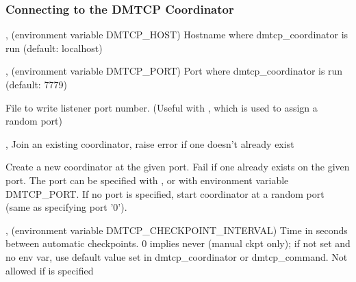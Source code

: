\subsubsection{Connecting to the DMTCP Coordinator}
\begin{Description}
  \item[\Opt{-h}, \Opt{--host} \Arg{hostname} (environment variable DMTCP_HOST)]
    Hostname where dmtcp_coordinator is run (default: localhost)

  \item[\Opt{-p}, \Opt{--port} \Arg{port} (environment variable DMTCP_PORT)]
    Port where dmtcp_coordinator is run (default: 7779)

  \item[\OptSArg{--port-file}{filename}]
    File to write listener port number.
    (Useful with , which is used to assign a random port)

  \item[\Opt{-j}, \Opt{--join}]
    Join an existing coordinator, raise error if one doesn't
    already exist

  \item[\Opt{--new-coordinator}]
    Create a new coordinator at the given port. Fail if one
    already exists on the given port. The port can be specified
    with , or with environment variable DMTCP_PORT.  If no
    port is specified, start coordinator at a random port (same
    as specifying port '0').


  \item[\Opt{-i}, \Opt{-interval} \Arg{seconds} (environment variable DMTCP_CHECKPOINT_INTERVAL)]
    Time in seconds between automatic checkpoints.
    0 implies never (manual ckpt only); if not set and no env var,
    use default value set in dmtcp_coordinator or dmtcp_command.
    Not allowed if  is specified
\end{Description}

